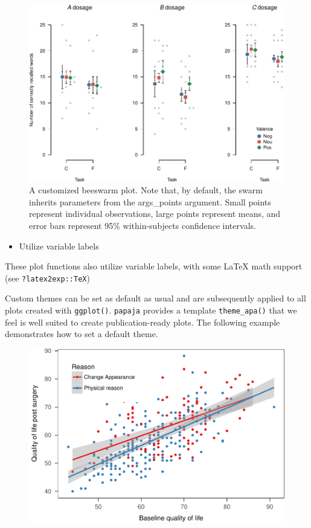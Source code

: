 \documentclass[man,floatsintext]{apa6}
\providecommand{\tightlist}{%
  \setlength{\itemsep}{0pt}\setlength{\parskip}{0pt}}
\theoremstyle{definition}
\theoremstyle{definition}
\theoremstyle{definition}
\theoremstyle{remark}
\begin{document}
\begin{figure}
\centering
\includegraphics{paper_files/figure-latex/customized-plot-1.pdf}
\caption{\label{fig:customized-plot}A customized beeswarm plot. Note that, by
default, the swarm inherits parameters from the args\_points argument.
Small points represent individual observations, large points represent
means, and error bars represent 95\% within-subjects confidence
intervals.}
\end{figure}

\begin{itemize}
\tightlist
\item
  Utilize variable labels
\end{itemize}

These plot functions also utilize variable labels, with some LaTeX math
support (see \texttt{?latex2exp::TeX})

Custom themes can be set as default as usual and are subsequently
applied to all plots created with \texttt{ggplot()}. \texttt{papaja}
provides a template \texttt{theme\_apa()} that we feel is well suited to
create publication-ready plots. The following example demonstrates how
to set a default theme.

\begin{figure}
\centering
\includegraphics{paper_files/figure-latex/ggplot-1.pdf}
\caption{}
\end{figure}
\end{document}
